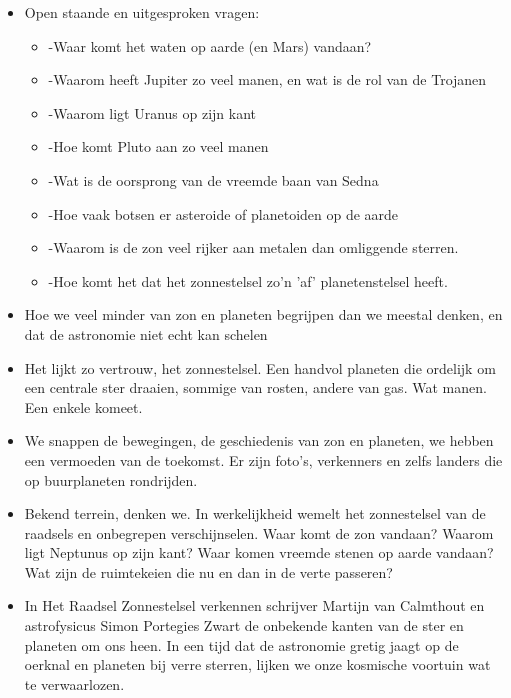 \documentclass[11pt,fleqn]{book} %
\begin{document}
\begin{itemize}
\item Open staande en uitgesproken vragen:
  \begin{itemize}
  \item -Waar komt het waten op aarde (en Mars) vandaan?
  \item -Waarom heeft Jupiter zo veel manen, en wat is de rol van de Trojanen
  \item -Waarom ligt Uranus op zijn kant
  \item -Hoe komt Pluto aan zo veel manen
  \item -Wat is de oorsprong van de vreemde baan van Sedna
  \item -Hoe vaak botsen er asteroide of planetoiden op de aarde
  \item -Waarom is de zon veel rijker aan metalen dan omliggende sterren.
  \item -Hoe komt het dat het zonnestelsel zo'n 'af' planetenstelsel heeft.
  \end{itemize}
\end{itemize}

\begin{itemize}
  \item Hoe we veel minder van zon en planeten begrijpen dan we meestal denken, en dat de astronomie niet echt kan schelen

  \item   Het lijkt zo vertrouw, het zonnestelsel. Een handvol planeten die ordelijk om een centrale ster draaien, sommige van rosten, andere van gas. Wat manen. Een enkele komeet.

  \item   We snappen de bewegingen, de geschiedenis van zon en planeten, we hebben een vermoeden van de toekomst. Er zijn foto’s, verkenners en zelfs landers die op buurplaneten rondrijden.

  \item   Bekend terrein, denken we. In werkelijkheid wemelt het zonnestelsel van de raadsels en onbegrepen verschijnselen. Waar komt de zon vandaan? Waarom ligt Neptunus op zijn kant? Waar komen vreemde stenen op aarde vandaan? Wat zijn de ruimtekeien die nu en dan in de verte passeren?

  \item   In Het Raadsel Zonnestelsel verkennen schrijver Martijn van Calmthout en astrofysicus Simon Portegies Zwart de onbekende kanten van de ster en planeten om ons heen. In een tijd dat de astronomie gretig jaagt op de oerknal en planeten bij verre sterren, lijken we onze kosmische voortuin wat te verwaarlozen.
\end{itemize}
  
\end{document}
